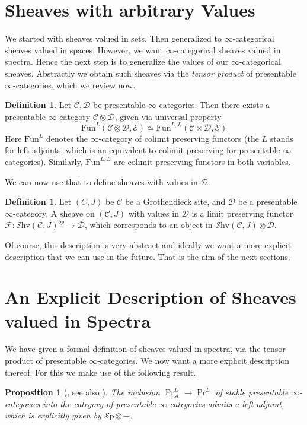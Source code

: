 \documentclass[10pt]{amsart}
\newcommand{\C}{\mathscr{C}}
\newcommand{\D}{\mathscr{D}}
\newcommand{\E}{\mathscr{E}}
\newcommand{\F}{\mathscr{F}}
\newcommand{\Sp}{\mathscr{S}\mathrm{p}}
\newcommand{\Fun}{\mathrm{Fun}}
\newcommand{\Shv}{\mathscr{S}\mathrm{hv}}
\newtheorem{proposition}[equation]{Proposition}
\theoremstyle{definition}
\newtheorem{definition}[equation]{Definition}
\theoremstyle{remark}
\begin{document}
\section{Sheaves with arbitrary Values}
We started with sheaves valued in sets. Then generalized to $\infty$-categorical sheaves valued in spaces. However, we want $\infty$-categorical sheaves valued in spectra. Hence the next step is to generalize the values of our $\infty$-categorical sheaves. Abstractly we obtain such sheaves via the \emph{tensor product} of presentable $\infty$-categories, which we review now.

\begin{definition}
  Let $\C, \D$ be presentable $\infty$-categories. Then there exists a presentable $\infty$-category $\C \otimes \D$, given via universal property 
  \[ \Fun^L(\C \otimes \D , \E) \simeq \Fun^{L,L}(\C \times \D, \E)\]
  Here $\Fun^L$ denotes the $\infty$-category of colimit preserving functors (the $L$ stands for left adjoints, which is an equivalent to colimit preserving for presentable $\infty$-categories). Similarly, $\Fun^{L,L}$ are colimit preserving functors in both variables.  
\end{definition}

We can now use that to define sheaves with values in $\D$.

\begin{definition}
  Let $(C,J)$ be $\C$ be a Grothendieck site, and $\D$ be a presentable $\infty$-category. A sheave on $(\C,J)$ with values in $\D$ is a limit preserving functor $\F\colon \Shv(\C,J)^{op} \to \D$, which corresponds to an object in $\Shv(\C,J) \otimes \D$. 
\end{definition}

Of course, this description is very abstract and ideally we want a more explicit description that we can use in the future. That is the aim of the next sections.

\section{An Explicit Description of Sheaves valued in Spectra}
We have given a formal definition of sheaves valued in spectra, via the tensor product of presentable $\infty$-categories. We now want a more explicit description thereof. For this we make use of the following result.

\begin{proposition}[{\cite{lurie2017ha}, see also \cite{gepnergrothnikolaus2015infiniteloopspacemachine}}]
 The inclusion $\Pr^L_{st} \to \Pr^L$ of stable presentable $\infty$-categories into the category of presentable $\infty$-categories admits a left adjoint, which is explicitly given by $\Sp \otimes -$.
\end{proposition}
\end{document}
